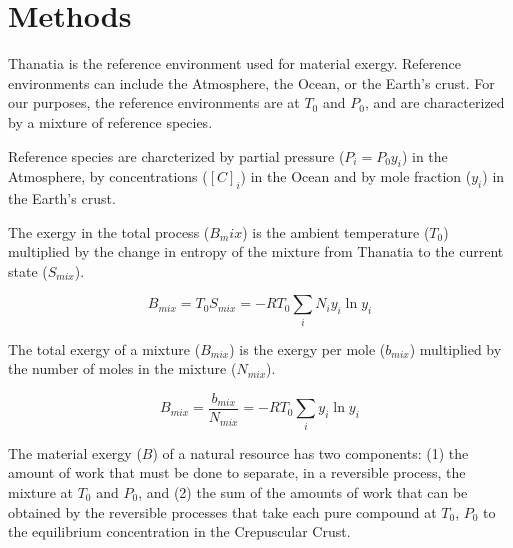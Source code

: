 \documentclass[energies,article,submit,pdftex,moreauthors]{Definitions/mdpi}
\begin{document}
\section{Methods}



Thanatia is the reference environment used for material exergy.
Reference environments can include the Atmosphere,
the Ocean, or the Earth's crust.
For our purposes,
the reference environments are at $T_{0}$ and $P_{0}$,
and are characterized by a mixture of reference species.

Reference species are charcterized by partial pressure
($P_{i} = P_{0} y_{i}$) in the Atmosphere,
by concentrations ($[C]_{i}$) in the Ocean
and by mole fraction ($y_{i}$)
in the Earth's crust.

The exergy in the total process ($B_mix$) is the ambient temperature ($T_{0}$) multiplied by the change
in entropy of the mixture from Thanatia to the current state ($S_{mix}$).

\begin{equation}\label{eq:specific_exergy_of_mixture_definition1}
  B_{mix} = T_{0}S_{mix} = -RT_{0}\sum_{i}{N_{i}{y_{i}}\ln{y_{i}}}
\end{equation}

The total exergy of a mixture ($B_{mix}$) is the exergy per mole ($b_{mix}$)
multiplied by the number of moles
in the mixture ($N_{mix}$).

\begin{equation}\label{eq:specific_exergy_of_mixture_definition2}
  B_{mix} = \frac{b_{mix}}{N_{mix}} = -RT_{0}\sum_{i}y_{i}\ln{y_{i}}
\end{equation}

The material exergy ($B$) of a natural resource
has two components:
(1) the amount of work that must be done
to separate, in a reversible process, the mixture
at $T_{0}$ and $P_{0}$, and
(2) the sum of the amounts of work
that can be obtained by the reversible processes
that take each pure compound at $T_{0}$, $P_{0}$
to the equilibrium concentration in the Crepuscular Crust.
\end{document}
